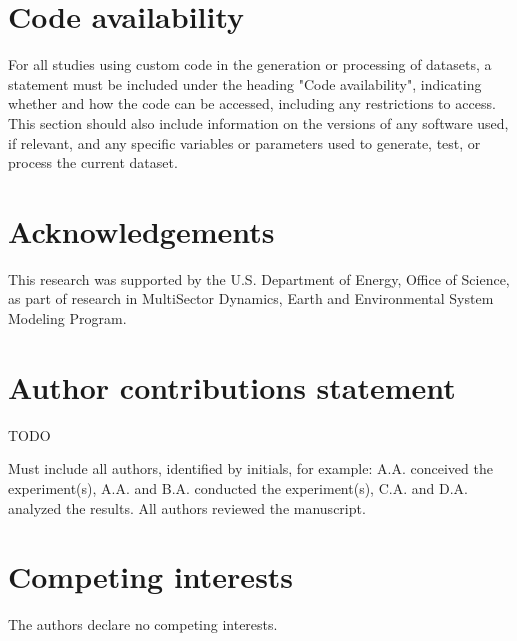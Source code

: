 \documentclass[fleqn,10pt]{wlscirep}
\begin{document}

\section*{Code availability}

For all studies using custom code in the generation or processing of datasets, a statement must be included under the heading "Code availability", indicating whether and how the code can be accessed, including any restrictions to access. This section should also include information on the versions of any software used, if relevant, and any specific variables or parameters used to generate, test, or process the current dataset. 



\section*{Acknowledgements}

This research was supported by the U.S. Department of Energy, Office of Science, as part of research in MultiSector Dynamics, Earth and Environmental System Modeling Program.

\section*{Author contributions statement}

TODO

Must include all authors, identified by initials, for example:
A.A. conceived the experiment(s), A.A. and B.A. conducted the experiment(s), C.A. and D.A. analyzed the results. All authors reviewed the manuscript. 

\section*{Competing interests}

The authors declare no competing interests.
\end{document}
